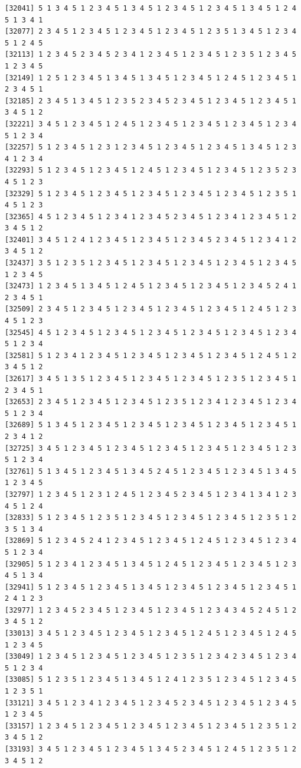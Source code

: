 \documentclass[
  11pt,
]{book}
\begin{document}
\begin{verbatim}
[32041] 5 1 3 4 5 1 2 3 4 5 1 3 4 5 1 2 3 4 5 1 2 3 4 5 1 3 4 5 1 2 4 5 1 3 4 1
[32077] 2 3 4 5 1 2 3 4 5 1 2 3 4 5 1 2 3 4 5 1 2 3 5 1 3 4 5 1 2 3 4 5 1 2 4 5
[32113] 1 2 3 4 5 2 3 4 5 2 3 4 1 2 3 4 5 1 2 3 4 5 1 2 3 5 1 2 3 4 5 1 2 3 4 5
[32149] 1 2 5 1 2 3 4 5 1 3 4 5 1 3 4 5 1 2 3 4 5 1 2 4 5 1 2 3 4 5 1 2 3 4 5 1
[32185] 2 3 4 5 1 3 4 5 1 2 3 5 2 3 4 5 2 3 4 5 1 2 3 4 5 1 2 3 4 5 1 3 4 5 1 2
[32221] 3 4 5 1 2 3 4 5 1 2 4 5 1 2 3 4 5 1 2 3 4 5 1 2 3 4 5 1 2 3 4 5 1 2 3 4
[32257] 5 1 2 3 4 5 1 2 3 1 2 3 4 5 1 2 3 4 5 1 2 3 4 5 1 3 4 5 1 2 3 4 1 2 3 4
[32293] 5 1 2 3 4 5 1 2 3 4 5 1 2 4 5 1 2 3 4 5 1 2 3 4 5 1 2 3 5 2 3 4 5 1 2 3
[32329] 5 1 2 3 4 5 1 2 3 4 5 1 2 3 4 5 1 2 3 4 5 1 2 3 4 5 1 2 3 5 1 4 5 1 2 3
[32365] 4 5 1 2 3 4 5 1 2 3 4 1 2 3 4 5 2 3 4 5 1 2 3 4 1 2 3 4 5 1 2 3 4 5 1 2
[32401] 3 4 5 1 2 4 1 2 3 4 5 1 2 3 4 5 1 2 3 4 5 2 3 4 5 1 2 3 4 1 2 3 4 5 1 2
[32437] 3 5 1 2 3 5 1 2 3 4 5 1 2 3 4 5 1 2 3 4 5 1 2 3 4 5 1 2 3 4 5 1 2 3 4 5
[32473] 1 2 3 4 5 1 3 4 5 1 2 4 5 1 2 3 4 5 1 2 3 4 5 1 2 3 4 5 2 4 1 2 3 4 5 1
[32509] 2 3 4 5 1 2 3 4 5 1 2 3 4 5 1 2 3 4 5 1 2 3 4 5 1 2 4 5 1 2 3 4 5 1 2 3
[32545] 4 5 1 2 3 4 5 1 2 3 4 5 1 2 3 4 5 1 2 3 4 5 1 2 3 4 5 1 2 3 4 5 1 2 3 4
[32581] 5 1 2 3 4 1 2 3 4 5 1 2 3 4 5 1 2 3 4 5 1 2 3 4 5 1 2 4 5 1 2 3 4 5 1 2
[32617] 3 4 5 1 3 5 1 2 3 4 5 1 2 3 4 5 1 2 3 4 5 1 2 3 5 1 2 3 4 5 1 2 3 4 5 1
[32653] 2 3 4 5 1 2 3 4 5 1 2 3 4 5 1 2 3 5 1 2 3 4 1 2 3 4 5 1 2 3 4 5 1 2 3 4
[32689] 5 1 3 4 5 1 2 3 4 5 1 2 3 4 5 1 2 3 4 5 1 2 3 4 5 1 2 3 4 5 1 2 3 4 1 2
[32725] 3 4 5 1 2 3 4 5 1 2 3 4 5 1 2 3 4 5 1 2 3 4 5 1 2 3 4 5 1 2 3 5 1 2 3 4
[32761] 5 1 3 4 5 1 2 3 4 5 1 3 4 5 2 4 5 1 2 3 4 5 1 2 3 4 5 1 3 4 5 1 2 3 4 5
[32797] 1 2 3 4 5 1 2 3 1 2 4 5 1 2 3 4 5 2 3 4 5 1 2 3 4 1 3 4 1 2 3 4 5 1 2 4
[32833] 5 1 2 3 4 5 1 2 3 5 1 2 3 4 5 1 2 3 4 5 1 2 3 4 5 1 2 3 5 1 2 3 5 1 3 4
[32869] 5 1 2 3 4 5 2 4 1 2 3 4 5 1 2 3 4 5 1 2 4 5 1 2 3 4 5 1 2 3 4 5 1 2 3 4
[32905] 5 1 2 3 4 1 2 3 4 5 1 3 4 5 1 2 4 5 1 2 3 4 5 1 2 3 4 5 1 2 3 4 5 1 3 4
[32941] 5 1 2 3 4 5 1 2 3 4 5 1 3 4 5 1 2 3 4 5 1 2 3 4 5 1 2 3 4 5 1 2 4 1 2 3
[32977] 1 2 3 4 5 2 3 4 5 1 2 3 4 5 1 2 3 4 5 1 2 3 4 3 4 5 2 4 5 1 2 3 4 5 1 2
[33013] 3 4 5 1 2 3 4 5 1 2 3 4 5 1 2 3 4 5 1 2 4 5 1 2 3 4 5 1 2 4 5 1 2 3 4 5
[33049] 1 2 3 4 5 1 2 3 4 5 1 2 3 4 5 1 2 3 5 1 2 3 4 2 3 4 5 1 2 3 4 5 1 2 3 4
[33085] 5 1 2 3 5 1 2 3 4 5 1 3 4 5 1 2 4 1 2 3 5 1 2 3 4 5 1 2 3 4 5 1 2 3 5 1
[33121] 3 4 5 1 2 3 4 1 2 3 4 5 1 2 3 4 5 2 3 4 5 1 2 3 4 5 1 2 3 4 5 1 2 3 4 5
[33157] 1 2 3 4 5 1 2 3 4 5 1 2 3 4 5 1 2 3 4 5 1 2 3 4 5 1 2 3 5 1 2 3 4 5 1 2
[33193] 3 4 5 1 2 3 4 5 1 2 3 4 5 1 3 4 5 2 3 4 5 1 2 4 5 1 2 3 5 1 2 3 4 5 1 2

\end{verbatim}
\end{document}
